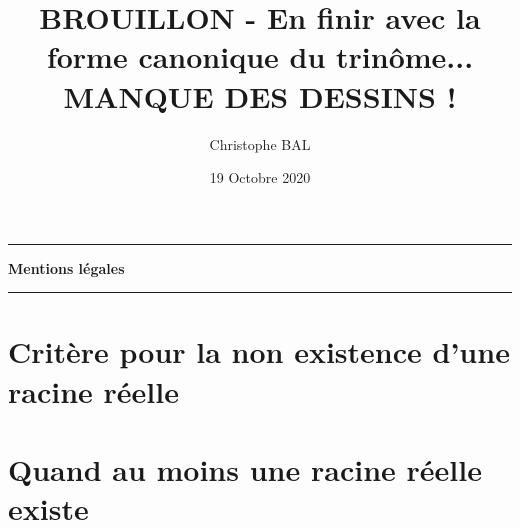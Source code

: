 \documentclass[12pt]{amsart}
\begin{document}
\title{BROUILLON - En finir avec la forme canonique du trinôme... \\ MANQUE DES DESSINS !}
\author{Christophe BAL}
\date{19 Octobre 2020}
\maketitle


\begin{center}
	\hrule\vspace{.3em}
	{
		\fontsize{1.35em}{1em}\selectfont
		\textbf{Mentions \og légales \fg}
	}
			
	\vspace{0.45em}
	\doclicenseThis
	\hrule
\end{center}



\setcounter{tocdepth}{2}
\tableofcontents




\newpage





\section{Critère pour la non existence d'une racine réelle}






\section{Quand au moins une racine réelle existe}


\end{document}
